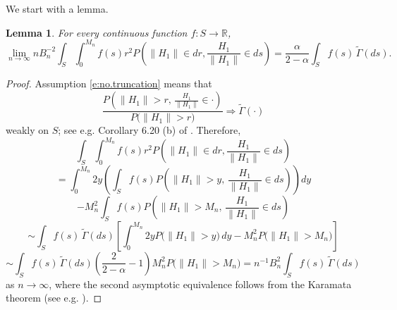 \documentclass[11pt]{amsart}
\newtheorem{lemma}{Lemma}[section]
\numberwithin{equation}{section}
\begin{document}
We start with a lemma.

\begin{lemma}\label{clt.l5} For every
  continuous function $f:S\longrightarrow\mathbb R$,
$$
\lim_{n\rightarrow\infty}nB_n^{-2}\int_S\int_0^{M_n}f(s)r^2P\left(\|H_1\|\in
  dr,\frac {H_1}{\|H_1\|}\in
  ds\right)=\frac\alpha{2-\alpha}\int_Sf(s)\, \tilde\Gamma(ds).
$$
\end{lemma}

\begin{proof} Assumption \eqref{e:no.truncation} means that
\begin{equation} \label{e:weak.conv}
\frac{P\left( \| H_1\|>r,\, \frac{H_1}{\| H_1\|}\in\cdot\right)}{P\bigl(
 \| H_1\|>r\bigr)}\Longrightarrow   \tilde\Gamma(\cdot)
\end{equation}
weakly on $S$; see e.g.  Corollary 6.20 (b) of
\cite{araujo:gine:1980}. Therefore,
$$
\int_S\int_0^{M_n}f(s)r^2P\left(\|H_1\|\in   dr,\frac {H_1}{\|H_1\|}\in
  ds\right)
$$
$$
= \int_0^{M_n} 2y\left( \int_S f(s)P\left(\|H_1\|>y,\,\frac {H_1}{\|H_1\|}\in
  ds\right)\right)dy
$$
$$
- M_n^2 \int_S f(s)P\left(\|H_1\|>M_n,\,\frac {H_1}{\|H_1\|}\in
  ds\right)
$$
$$
\sim \int_Sf(s)\, \tilde\Gamma(ds)\left[ \int_0^{M_n} 2yP\bigl(
  \|H_1\|>y\bigr)\, dy - M_n^2P\bigl( \|H_1\|>M_n\bigr)\right]
$$
$$
\sim \int_Sf(s)\, \tilde\Gamma(ds) \left( \frac{2}{2-\alpha}-1\right)
 M_n^2P\bigl( \|H_1\|>M_n\bigr) = n^{-1}B_n^2  \int_Sf(s)\,
 \tilde\Gamma(ds)
$$
as $n\to\infty$, where the second asymptotic equivalence follows from
the Karamata theorem (see e.g. \cite{resnick:1987}).
\end{proof}
\end{document}
